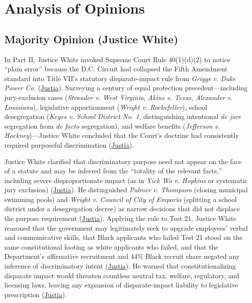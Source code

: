 \documentclass[12pt]{article}
\begin{document}
\section{Analysis of Opinions}

\subsection{Majority Opinion (Justice White)}

In Part II, Justice White invoked Supreme Court Rule 40(1)(d)(2) to notice ``plain error'' because the D.C. Circuit had collapsed the Fifth Amendment standard into Title VII's statutory disparate-impact rule from \textit{Griggs v. Duke Power Co.} (\href{https://supreme.justia.com/cases/federal/us/426/229/}{Justia}). Surveying a century of equal protection precedent---including jury-exclusion cases (\textit{Strauder v. West Virginia}, \textit{Akins v. Texas}, \textit{Alexander v. Louisiana}), legislative apportionment (\textit{Wright v. Rockefeller}), school desegregation (\textit{Keyes v. School District No. 1}, distinguishing intentional \textit{de jure} segregation from \textit{de facto} segregation), and welfare benefits (\textit{Jefferson v. Hackney})---Justice White concluded that the Court's doctrine had consistently required purposeful discrimination (\href{https://supreme.justia.com/cases/federal/us/426/229/}{Justia}).

Justice White clarified that discriminatory purpose need not appear on the face of a statute and may be inferred from the ``totality of the relevant facts,'' including severe disproportionate impact (as in \textit{Yick Wo v. Hopkins} or systematic jury exclusion) (\href{https://supreme.justia.com/cases/federal/us/426/229/}{Justia}). He distinguished \textit{Palmer v. Thompson} (closing municipal swimming pools) and \textit{Wright v. Council of City of Emporia} (splitting a school district under a desegregation decree) as narrow decisions that did not displace the purpose requirement (\href{https://supreme.justia.com/cases/federal/us/426/229/}{Justia}). Applying the rule to Test 21, Justice White reasoned that the government may legitimately seek to upgrade employees' verbal and communicative skills, that Black applicants who failed Test 21 stood on the same constitutional footing as white applicants who failed, and that the Department's affirmative recruitment and 44\% Black recruit share negated any inference of discriminatory intent (\href{https://supreme.justia.com/cases/federal/us/426/229/}{Justia}). He warned that constitutionalizing disparate impact would threaten countless neutral tax, welfare, regulatory, and licensing laws, leaving any expansion of disparate-impact liability to legislative prescription (\href{https://supreme.justia.com/cases/federal/us/426/229/}{Justia}).
\end{document}
